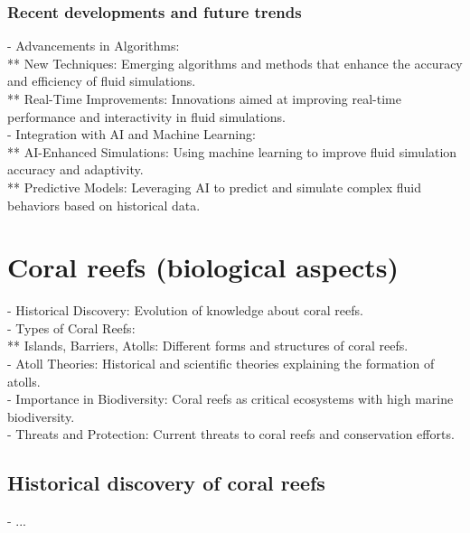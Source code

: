 \subsubsection{Recent developments and future trends}
- Advancements in Algorithms: \\
** New Techniques: Emerging algorithms and methods that enhance the accuracy and efficiency of fluid simulations. \\
** Real-Time Improvements: Innovations aimed at improving real-time performance and interactivity in fluid simulations. \\
- Integration with AI and Machine Learning: \\
** AI-Enhanced Simulations: Using machine learning to improve fluid simulation accuracy and adaptivity. \\
** Predictive Models: Leveraging AI to predict and simulate complex fluid behaviors based on historical data. 


\section{Coral reefs (biological aspects)}
\label{sec:state-of-the-art_biology}
- Historical Discovery: Evolution of knowledge about coral reefs. \\
- Types of Coral Reefs: \\
** Islands, Barriers, Atolls: Different forms and structures of coral reefs. \\
- Atoll Theories: Historical and scientific theories explaining the formation of atolls. \\
- Importance in Biodiversity: Coral reefs as critical ecosystems with high marine biodiversity. \\
- Threats and Protection: Current threats to coral reefs and conservation efforts.

\subsection{Historical discovery of coral reefs}
- ... 
